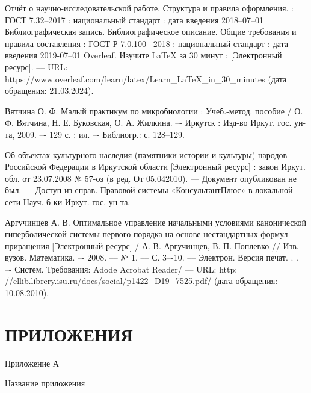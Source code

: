 \documentclass{report}
\begin{document}
\begin{thebibliography}{}

    Отчёт о научно-исследовательской работе. Структура и правила оформления. : ГОСТ 7.32--2017 : национальный стандарт : дата введения 2018–07–01
    Библиографическая запись. Библиографическое описание. Общие требования и правила составления : ГОСТ Р 7.0.100-–2018 : национальный стандарт : дата введения 2019-07–01
    Overleaf. Изучите LaTeX за 30 минут : [Электронный ресурс]. --– URL: https://www.overleaf.com/learn/latex/Learn\_LaTeX\_in\_30\_minutes \break(дата обращения: 21.03.2024).

    Вятчина О. Ф. Малый практикум по микробиологии : Учеб.-метод. пособие / О. Ф. Вятчина, Н. Е. Буковская, О. А. Жилкина. –- Иркутск : Изд-во Иркут. гос. ун-та, 2009. –- 129 с. : ил. –- Библиогр.: с. 128–129.

    Об объектах культурного наследия (памятники истории и культуры) народов Российской Федерации в Иркутской области [Электронный ресурс]  : закон Иркут. обл. от 23.07.2008 № 57-оз (в ред. От 05.042010). --– Документ опубликован не был. --– Доступ из справ. Правовой системы «КонсультантПлюс» в локальной сети Науч. б-ки Иркут. гос. ун-та.
    
    Аргучинцев А. В. Оптимальное управление начальными условиями канонической гиперболической системы первого порядка на основе нестандартных формул приращения [Электронный ресурс] / А. В. Аргучинцев, В. П. Поплевко // Изв. вузов. Математика. –- 2008. --– № 1. --– С. 3–-10. --– Электрон. Версия печат. . . –- Систем. Требования: Adode Acrobat Reader/ --- URL: http: //ellib.librery.isu.ru/docs/social/p1422\_D19\_7525.pdf/ (дата обращения: 10.08.2010).

\end{thebibliography}


\chapter*{ПРИЛОЖЕНИЯ}
\begin{flushright}
     Приложение А
\end{flushright}

\begin{center}  Название приложения \end{center}
\end{document}
